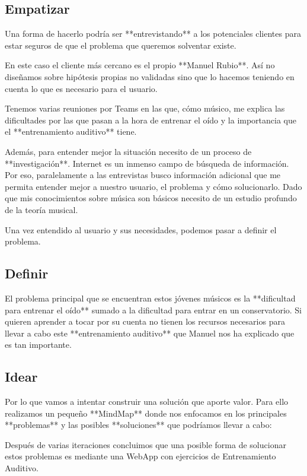 \documentclass[12pt,twoside,titlepage]{report}
\begin{document}
\subsection{Empatizar}

Una forma de hacerlo podría ser **entrevistando** a los potenciales clientes para estar seguros de que el problema que queremos solventar existe.

En este caso el cliente más cercano es el propio **Manuel Rubio**. Así no diseñamos sobre hipótesis propias no validadas sino que lo hacemos teniendo en cuenta lo que es necesario para el usuario.

Tenemos varias reuniones por Teams en las que, cómo músico, me explica las dificultades por las que pasan a la hora de entrenar el oído y la importancia que el **entrenamiento auditivo** tiene.

Además, para entender mejor la situación necesito de un proceso de **investigación**. Internet es un inmenso campo de búsqueda de información. Por eso, paralelamente a las entrevistas busco información adicional que me permita entender mejor a nuestro usuario, el problema y cómo solucionarlo. Dado que mis conocimientos sobre música son básicos necesito de un estudio profundo de la teoría musical. 

Una vez entendido al usuario y sus necesidades, podemos pasar a definir el problema.

\subsection{Definir}

El problema principal que se encuentran estos jóvenes músicos es la **dificultad para entrenar el oído** sumado a la dificultad para entrar en un conservatorio. Si quieren aprender a tocar por su cuenta no tienen los recursos necesarios para llevar a cabo este **entrenamiento auditivo** que Manuel nos ha explicado que es tan importante.

\subsection{Idear}

Por lo que vamos a intentar construir una solución que aporte valor. Para ello realizamos un pequeño **MindMap** donde nos enfocamos en los principales **problemas** y las posibles **soluciones** que podríamos llevar a cabo:

Después de varias iteraciones concluimos que una posible forma de solucionar estos problemas es mediante una WebApp con ejercicios de Entrenamiento Auditivo. 
\end{document}
